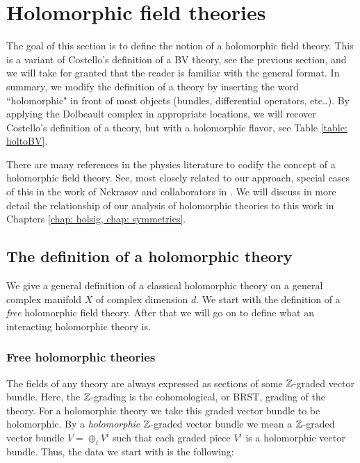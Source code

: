 \documentclass[10pt]{amsart}
\begin{document}

\section{Holomorphic field theories} \label{sec: hol theory}

The goal of this section is to define the notion of a holomorphic field theory. 
This is a variant of Costello's definition of a BV theory, see the previous section, and we will take for granted that the reader is familiar with the general format.
In summary, we modify the definition of a theory by inserting the word ``holomorphic" in front of most objects (bundles, differential operators, etc..).
By applying the Dolbeault complex in appropriate locations, we will recover Costello's definition of a theory, but with a holomorphic flavor, see Table \ref{table: holtoBV}. 

There are many references in the physics literature to codify the concept of a holomorphic field theory.
See, most closely related to our approach, special cases of this in the work of Nekrasov and collaborators in \cite{NekThesis, NekChiral, NekCFT}. 
We will discuss in more detail the relationship of our analysis of holomorphic theories to this work in Chapters \ref{chap: holsig, chap: symmetries}. 

\subsection{The definition of a holomorphic theory}

We give a general definition of a classical holomorphic theory on a general complex manifold $X$ of complex dimension $d$.
We start with the definition of a {\em free} holomorphic field theory. 
After that we will go on to define what an interacting holomorphic theory is.

\subsubsection{Free holomorphic theories}

The fields of any theory are always expressed as sections of some $\mathbb Z$-graded vector bundle.
Here, the $\mathbb Z$-grading is the cohomological, or BRST, grading of the theory.
For a holomorphic theory we take this graded vector bundle to be holomorphic.  
By a {\em holomorphic} $\mathbb Z$-graded vector bundle we mean a $\mathbb Z$-graded vector bundle $
V = \oplus_i V^i$ such that each graded piece $V^i$ is a holomorphic vector bundle. 
Thus, the data we start with is the following:
\end{document}
